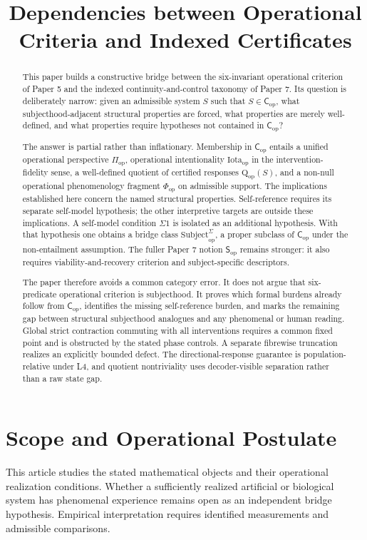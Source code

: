 \documentclass[11pt,a4paper]{article}
\title{\textbf{Dependencies between Operational Criteria and Indexed Certificates}}
\author{\AuthorVisible}
\date{}
\theoremstyle{definition}
\newcommand{\Cop}{\mathsf{C}_{\mathrm{op}}}
\newcommand{\Subop}{\mathsf{S}_{\mathrm{op}}}
\newcommand{\Subbridge}{\mathrm{Subject}^{\Sigma}_{\mathrm{op}}}
\newcommand{\Qop}{\mathrm{Q}_{\mathrm{op}}}
\newcommand{\Piop}{\Pi_{\mathrm{op}}}
\newcommand{\Iotaop}{\mathrm{Iota}_{\mathrm{op}}}
\newcommand{\Phiop}{\Phi_{\mathrm{op}}}
\begin{document}
\setlength{\emergencystretch}{3em}
\maketitle

\begin{abstract}
This paper builds a constructive bridge between the six-invariant operational criterion of Paper 5 and the indexed continuity-and-control taxonomy of Paper 7. Its question is deliberately narrow: given an admissible system $S$ such that $S \in \Cop$, what subjecthood-adjacent structural properties are forced, what properties are merely well-defined, and what properties require hypotheses not contained in $\Cop$?

The answer is partial rather than inflationary. Membership in $\Cop$ entails a unified operational perspective $\Piop$, operational intentionality $\Iotaop$ in the intervention-fidelity sense, a well-defined quotient of certified responses $\Qop(S)$, and a non-null operational phenomenology fragment $\Phiop$ on admissible support. The implications established here concern the named structural properties. Self-reference requires its separate self-model hypothesis; the other interpretive targets are outside these implications. A self-model condition $\Sigma1$ is isolated as an additional hypothesis. With that hypothesis one obtains a bridge class $\Subbridge$, a proper subclass of $\Cop$ under the non-entailment assumption. The fuller Paper 7 notion $\Subop$ remains stronger: it also requires viability-and-recovery criterion and subject-specific descriptors.

The paper therefore avoids a common category error. It does not argue that six-predicate operational criterion is subjecthood. It proves which formal burdens already follow from $\Cop$, identifies the missing self-reference burden, and marks the remaining gap between structural subjecthood analogues and any phenomenal or human reading.
Global strict contraction commuting with all interventions requires a common fixed point and is obstructed by the stated phase controls. A separate fibrewise truncation realizes an explicitly bounded defect. The directional-response guarantee is population-relative under L4, and quotient nontriviality uses decoder-visible separation rather than a raw state gap.
\end{abstract}

\section*{Scope and Operational Postulate}
This article studies the stated mathematical objects and their operational
realization conditions. Whether a sufficiently realized artificial or biological
system has phenomenal experience remains open as an independent bridge
hypothesis. Empirical interpretation requires identified measurements and
admissible comparisons.
\end{document}
